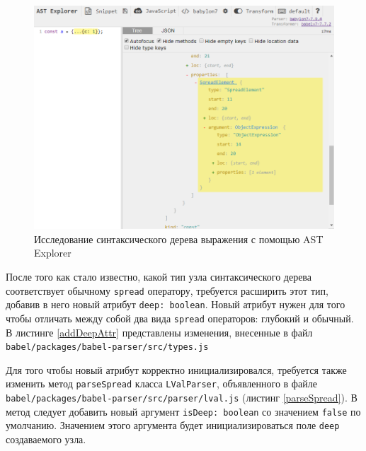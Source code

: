 \documentclass[14pt, a4paper]{article}
\def\code#1{\texttt{#1}} %
\begin{document}
\begin{figure}[h!]
  \centering
  \includegraphics[scale=0.7]{img/ast-explorer.png}
  \caption{Исследование синтаксического дерева выражения с помощью AST Explorer}
  \label{ast_explorer}
\end{figure}

После того как стало известно, какой тип узла синтаксического дерева соответствует обычному \code{spread}
оператору, требуется расширить этот тип, добавив в него новый атрибут \code{deep: boolean}. Новый атрибут
нужен для того чтобы отличать между собой два вида \code{spread} операторов: глубокий и обычный. 
В листинге \ref{addDeepAttr} представлены изменения, внесенные в файл \code{babel/packages/babel-parser/src/types.js}



Для того чтобы новый атрибут корректно инициализировался, требуется также изменить метод \code{parseSpread} класса
\code{LValParser}, объявленного в файле \code{babel/packages/babel-parser/src/parser/lval.js} (листинг \ref{parseSpread}). 
В метод следует добавить новый аргумент \code{isDeep: boolean} со значением \code{false} по умолчанию.
Значением этого аргумента будет инициализироваться поле \code{deep} создаваемого узла.


\end{document}
